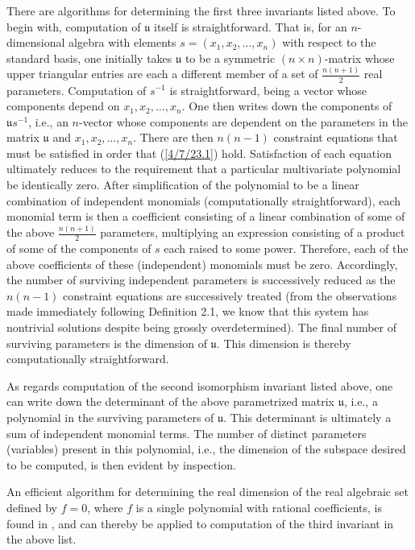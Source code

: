 \documentclass{amsart}
\numberwithin{equation}{section}
\theoremstyle{definition}
\numberwithin{theorem}{section}
\begin{document}
There are algorithms for determining the first three invariants listed above.  To begin with, computation of $\mathfrak{u}$ itself is straightforward.  That is, for an $n$-dimensional algebra with elements $s = (x_1,x_2,\dots,x_n)$ with respect to the standard basis, one initially takes $\mathfrak{u}$ to be a symmetric $(n\times n)$-matrix  whose upper triangular entries are each a different member of a set of $\frac{n(n+1)}{2}$ real parameters.  Computation of $s^{-1}$ is straightforward, being a vector whose components depend on $x_1,x_2,\dots,x_n$.  One then writes down the components of $\mathfrak{u}s^{-1}$, i.e., an $n$-vector whose components are dependent on the parameters in the matrix $\mathfrak{u}$ and $x_1,x_2,\dots,x_n$.  There are then $n(n-1)$ constraint equations that must be satisfied in order that (\ref{4/7/23.1}) hold.  Satisfaction of each equation ultimately reduces to the requirement that a particular multivariate polynomial be identically zero.  After simplification of the polynomial to be a linear combination of independent monomials (computationally straightforward), each monomial term is then a coefficient consisting of a linear combination of some of the above $\frac{n(n+1)}{2}$ parameters, multiplying an expression consisting of a product of some of the components of $s$ each raised to some power.  Therefore, each of the above coefficients of these (independent) monomials must be zero.  Accordingly, the number of surviving independent parameters is successively reduced as the $n(n-1)$ constraint equations are successively treated  (from the observations made immediately following Definition 2.1, we know that this system has nontrivial solutions despite being grossly overdetermined).   The final number of surviving parameters is the dimension of $\mathfrak{u}$.  This dimension is thereby computationally straightforward.

As regards computation of the second isomorphism invariant listed above, one can write down the determinant of the above parametrized matrix $\mathfrak{u}$, i.e., a polynomial in the surviving parameters of $\mathfrak{u}$.  This determinant is ultimately a sum of independent monomial terms.  The number of distinct parameters (variables) present in this polynomial, i.e., the dimension of the subspace desired to be computed, is then evident by inspection.

An efficient algorithm for determining the real dimension of the real algebraic set defined by $f=0$, where $f$ is a single polynomial with rational coefficients, is found in \cite{bannwarth:2015}, and can thereby be applied to computation of the third invariant in the above list. 
\end{document}
